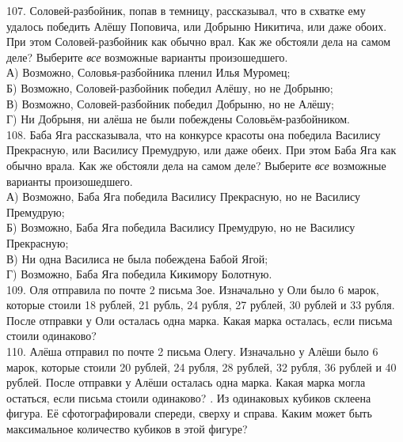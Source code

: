 \documentclass[12pt]{article}
\begin{document}
107. Соловей-разбойник, попав в темницу, рассказывал, что в схватке ему удалось победить Алёшу Поповича, или Добрыню Никитича, или даже обоих. При этом Соловей-разбойник как обычно врал. Как же обстояли дела на самом деле? Выберите {\it все} возможные варианты произошедшего.\\
А) Возможно, Соловья-разбойника пленил Илья Муромец;\\
Б) Возможно, Соловей-разбойник победил Алёшу, но не Добрыню;\\
В) Возможно, Соловей-разбойник победил Добрыню, но не Алёшу;\\
Г) Ни Добрыня, ни алёша не были побеждены Соловьём-разбойником.\\
108. Баба Яга рассказывала, что на конкурсе красоты она победила Василису Прекрасную, или Василису Премудрую, или даже обеих. При этом Баба Яга как обычно врала. Как же обстояли дела на самом деле? Выберите {\it все} возможные варианты произошедшего.\\
А) Возможно, Баба Яга победила Василису Прекрасную, но не Василису Премудрую;\\
Б) Возможно, Баба Яга победила Василису Премудрую, но не Василису Прекрасную;\\
В) Ни одна Василиса не была побеждена Бабой Ягой;\\
Г) Возможно, Баба Яга победила Кикимору Болотную.\\
109. Оля отправила по почте 2 письма Зое. Изначально у Оли было 6 марок, которые стоили 18 рублей, 21 рубль, 24 рубля, 27 рублей, 30 рублей и 33 рубля. После отправки у Оли осталась одна марка. Какая марка осталась, если письма стоили одинаково?\\
110. Алёша отправил по почте 2 письма Олегу. Изначально у Алёши было 6 марок, которые стоили 20 рублей, 24 рубля, 28 рублей, 32 рубля, 36 рублей и 40 рублей. После отправки у Алёши осталась одна марка. Какая марка могла остаться, если письма стоили одинаково?
\newpage
{}. Из одинаковых кубиков склеена фигура. Её сфотографировали спереди, сверху и справа. Каким может быть максимальное количество кубиков в этой фигуре?
\begin{center}
\begin{figure}[ht!]
\end{figure}
\end{center}
\end{document}
